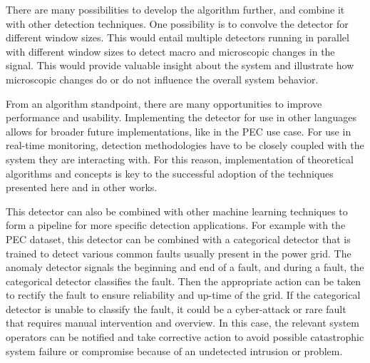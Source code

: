 There are many possibilities to develop the algorithm further, and combine it with other detection techniques. One possibility is to convolve the detector for different window sizes. This would entail multiple detectors running in parallel with different window sizes to detect macro and microscopic changes in the signal. This would provide valuable insight about the system and illustrate how microscopic changes do or do not influence the overall system behavior.

From an algorithm standpoint, there are many opportunities to improve performance and usability. Implementing the detector for use in other languages allows for broader future implementations, like in the PEC use case. For use in real-time monitoring, detection methodologies have to be closely coupled with the system they are interacting with. For this reason, implementation of theoretical algorithms and concepts is key to the successful adoption of the techniques presented here and in other works.

This detector can also be combined with other machine learning techniques to form a pipeline for more specific detection applications. For example with the PEC dataset, this detector can be combined with a categorical detector that is trained to detect various common faults usually present in the power grid. The anomaly detector signals the beginning and end of a fault, and during a fault, the categorical detector classifies the fault. Then the appropriate action can be taken to rectify the fault to ensure reliability and up-time of the grid. If the categorical detector is unable to classify the fault, it could be a cyber-attack or rare fault that requires manual intervention and overview. In this case, the relevant system operators can be notified and take corrective action to avoid possible catastrophic system failure or compromise because of an undetected intrusion or problem. 

